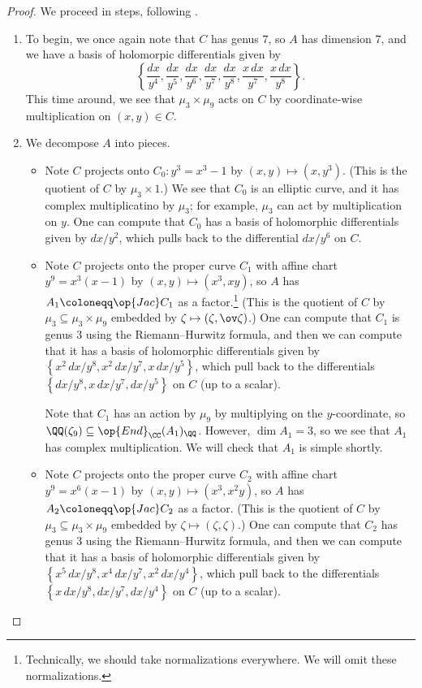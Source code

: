 \documentclass[../thesis.tex]{subfiles}
\begin{document}
\begin{proof}
	We proceed in steps, following .
	\begin{enumerate}
		\item To begin, we once again note that $C$ has genus $7$, so $A$ has dimension $7$, and we have a basis of holomorpic differentials given by
		\[\left\{\frac{dx}{y^4},\frac{dx}{y^5},\frac{dx}{y^6},\frac{dx}{y^7},\frac{dx}{y^8},\frac{x\,dx}{y^7},\frac{x\,dx}{y^8}\right\}.\]
		This time around, we see that $\mu_3\times\mu_9$ acts on $C$ by coordinate-wise multiplication on $(x,y)\in C$.

		\item We decompose $A$ into pieces.
		\begin{itemize}
			\item Note $C$ projects onto $C_0\colon y^3=x^3-1$ by $(x,y)\mapsto\left(x,y^3\right)$. (This is the quotient of $C$ by $\mu_3\times1$.) We see that $C_0$ is an elliptic curve, and it has complex multiplicatino by $\mu_3$; for example, $\mu_3$ can act by multiplication on $y$. One can compute that $C_0$ has a basis of holomorphic differentials given by $dx/y^2$, which pulls back to the differential $dx/y^6$ on $C$.

			\item Note $C$ projects onto the proper curve $C_1$ with affine chart $y^9=x^3(x-1)$ by $(x,y)\mapsto\left(x^3,xy\right)$, so $A$ has $A_1\coloneqq\op{Jac}C_1$ as a factor.\footnote{Technically, we should take normalizations everywhere. We will omit these normalizations.} (This is the quotient of $C$ by $\mu_3\subseteq\mu_3\times\mu_9$ embedded by $\zeta\mapsto\left(\zeta,\ov\zeta\right)$.) One can compute that $C_1$ is genus $3$ using the Riemann--Hurwitz formula, and then we can compute that it has a basis of holomorphic differentials given by $\left\{x^2\,dx/y^8,x^2\,dx/y^7,x\,dx/y^5\right\}$, which pull back to the differentials $\left\{dx/y^8,x\,dx/y^7,dx/y^5\right\}$ on $C$ (up to a scalar).

			Note that $C_1$ has an action by $\mu_9$ by multiplying on the $y$-coordinate, so $\QQ(\zeta_9)\subseteq\op{End}_\CC(A_1)_\QQ$. However, $\dim A_1=3$, so we see that $A_1$ has complex multiplication. We will check that $A_1$ is simple shortly.

			\item Note $C$ projects onto the proper curve $C_2$ with affine chart $y^9=x^6(x-1)$ by $(x,y)\mapsto\left(x^3,x^2y\right)$, so $A$ has $A_2\coloneqq\op{Jac}C_2$ as a factor. (This is the quotient of $C$ by $\mu_3\subseteq\mu_3\times\mu_9$ embedded by $\zeta\mapsto\left(\zeta,\zeta\right)$.) One can compute that $C_2$ has genus $3$ using the Riemann--Hurwitz formula, and then we can compute that it has a basis of holomorphic differentials given by $\left\{x^5\,dx/y^8,x^4\,dx/y^7,x^2\,dx/y^4\right\}$, which pull back to the differentials $\left\{x\,dx/y^8,dx/y^7,dx/y^4\right\}$ on $C$ (up to a scalar).


\end{itemize}
\end{enumerate}
\end{proof}
\end{document}

